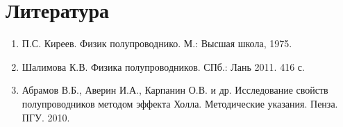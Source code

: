 \section{Литература}
\begin{enumerate}
\item П.С. Киреев. Физик полупроводнико. М.: Высшая школа, 1975.
\item Шалимова К.В. Физика полупроводников. СПб.: Лань 2011. 416 с.
\item Абрамов В.Б., Аверин И.А., Карпанин О.В. и др. Исследование свойств полупроводников методом эффекта Холла. Методические указания. Пенза. ПГУ. 2010.
\end{enumerate}